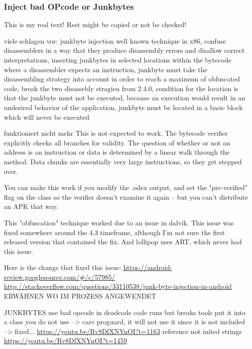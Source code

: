 \subsubsection{Inject bad OPcode or Junkbytes} \label{subsubsection:counter-reengineering-break-inject}
This is my real text! Rest might be copied or not be checked!


%
viele schlagen vor:
junkbyte injection
well known technique in x86, confuse disassemblers in a way that they produce disassembly errors and disallow correct interpretations, inserting junkbytes in selected locations within the bytecode where a disassembler expects an instruction, junkbyte must take the disassembling strategy into account in order to reach a maximum of obfuscated code, break the two disassebly stragien from 2.4.0, condition for the location is that the junkbyte must not be executed, because an execution would result in an undesired behavior of the application,  junkbyte must be located in a basic block which will never be executed
\cite{schulzCodeProtection}
%


funktioniert nicht mehr
This is not expected to work. The bytecode verifier explicitly checks all branches for validity. The question of whether or not an address is an instruction or data is determined by a linear walk through the method. Data chunks are essentially very large instructions, so they get stepped over.

You can make this work if you modify the .odex output, and set the "pre-verified" flag on the class so the verifier doesn't examine it again -- but you can't distribute an APK that way.

This "obfuscation" technique worked due to an issue in dalvik. This issue was fixed somewhere around the 4.3 timeframe, although I'm not sure the first released version that contained the fix. And lollipop uses ART, which never had this issue.

Here is the change that fixed this issue: \url{https://android-review.googlesource.com/#/c/57985/}
\url{http://stackoverflow.com/questions/33110538/junk-byte-injection-in-android}
%
ERWÄHNEN WO IM PROZESS ANGEWENDET\newline

JUNKBYTES\newline
use bad opcode in deadcode \newline
code runs but breaks tools\newline
put it into a class you do not use --> care proguard, it will not use it since it is not included\newline
--> fixed...\newline
\url{https://youtu.be/Rv8DfXNYnOI?t=1163}\newline
reference not inited strings\newline
\url{https://youtu.be/Rv8DfXNYnOI?t=1459}
